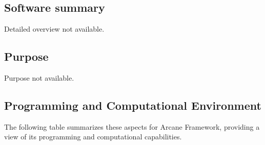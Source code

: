 \subsection{Software summary}
\label{sec:Arcane Framework:summary}
Detailed overview not available.



\subsection{Purpose}
\label{sec:Arcane Framework:purpose}
Purpose not available.

\subsection{Programming and Computational Environment}
\label{sec::Arcane Framework:environment_capabilities}


The following table summarizes these aspects for Arcane Framework, providing a  view of its programming and computational capabilities.

